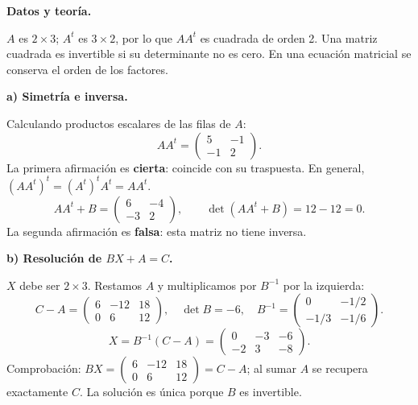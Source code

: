 \textbf{Datos y teoría.}\par\nopagebreak[4]
$A$ es $2\times3$; $A^t$ es $3\times2$, por lo que $AA^t$ es cuadrada de orden 2. Una matriz cuadrada es invertible si su determinante no es cero. En una ecuación matricial se conserva el orden de los factores.

\textbf{a) Simetría e inversa.}\par\nopagebreak[4]
Calculando productos escalares de las filas de $A$:
\[
 AA^t=\begin{pmatrix}5&-1\\-1&2\end{pmatrix}.
\]
La primera afirmación es \textbf{cierta}: coincide con su traspuesta. En general, $(AA^t)^t=(A^t)^tA^t=AA^t$.
\[
 AA^t+B=\begin{pmatrix}6&-4\\-3&2\end{pmatrix},\qquad
 \det(AA^t+B)=12-12=0.
\]
La segunda afirmación es \textbf{falsa}: esta matriz no tiene inversa.

\textbf{b) Resolución de $BX+A=C$.}\par\nopagebreak[4]
$X$ debe ser $2\times3$. Restamos $A$ y multiplicamos por $B^{-1}$ por la izquierda:
\[
 C-A=\begin{pmatrix}6&-12&18\\0&6&12\end{pmatrix},\quad
 \det B=-6,\quad
 B^{-1}=\begin{pmatrix}0&-1/2\\-1/3&-1/6\end{pmatrix}.
\]
\[
 \boxed{X=B^{-1}(C-A)=\begin{pmatrix}0&-3&-6\\-2&3&-8\end{pmatrix}.}
\]
Comprobación: $BX=\begin{pmatrix}6&-12&18\\0&6&12\end{pmatrix}=C-A$; al sumar $A$ se recupera exactamente $C$. La solución es única porque $B$ es invertible.
